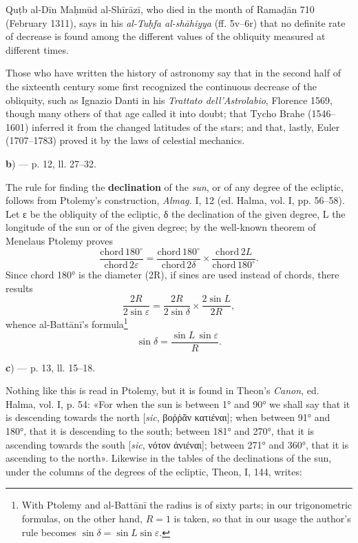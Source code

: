 \documentclass[11pt]{article}
\newcommand{\Pg}[1]{\marginpar{\footnotesize\color{gray}#1}}
\begin{document}
\par Quṭb al-Dīn Maḥmūd al-Shīrāzī, who died in the month of Ramaḍān 710 (February 1311), says in his \emph{al-Tuḥfa al-shāhiyya} (ff. 5v–6r) that no definite rate of decrease is found among the different values of the obliquity measured at different times.\par
\par Those who have written the history of astronomy say that in the second half of the sixteenth century some first recognized the continuous decrease of the obliquity, such as Ignazio Danti in his \emph{Trattato dell’Astrolabio}, Florence 1569, though many others of that age called it into doubt; that Tycho Brahe (1546–1601) inferred it from the changed latitudes of the stars; and that, lastly, Euler (1707–1783) proved it by the laws of celestial mechanics.\par
\par\begin{center}\textbf{b}) — p. 12, ll. 27–32.\end{center}
\par The rule for finding the \textbf{declination} of the \emph{sun}, or of any degree of the ecliptic, follows from Ptolemy's construction, \emph{Almag.} I, 12 (ed. Halma, vol. I, pp. 56–58). Let {\greekfont ε} be the obliquity of the ecliptic, {\greekfont δ} the declination of the given degree, L the longitude of the sun or of the given degree; by the well-known theorem of Menelaus Ptolemy proves \[ \frac{\text{chord}\,180^\circ}{\text{chord}\,2\varepsilon} = \frac{\text{chord}\,180^\circ}{\text{chord}\,2\delta} \times \frac{\text{chord}\,2L}{\text{chord}\,180^\circ}. \] Since chord 180° is the diameter (2R), if sines are used instead of chords, there results \[ \frac{2R}{2\sin\varepsilon} = \frac{2R}{2\sin\delta} \times \frac{2\sin L}{2R}, \] whence al-Battānī's formula\footnote{With Ptolemy and al-Battānī the radius is of sixty parts; in our trigonometric formulas, on the other hand, $R = 1$ is taken, so that in our usage the author's rule becomes $\sin\delta = \sin L \sin\varepsilon$.} \[ \sin\delta = \frac{\sin L\,\sin\varepsilon}{R}. \]\par
\par\begin{center}\textbf{c}) — p. 13, ll. 15–18.\end{center}
\par \Pg{I 163}Nothing like this is read in Ptolemy, but it is found in Theon's \emph{Canon}, ed. Halma, vol. I, p. 54: «For when the sun is between 1° and 90° we shall say that it is descending towards the north [\emph{sic}, {\greekfont βοῤῥᾶν κατιέναι}]; when between 91° and 180°, that it is descending to the south; between 181° and 270°, that it is ascending towards the south [\emph{sic}, {\greekfont νότον ἀνιέναι}]; between 271° and 360°, that it is ascending to the north». Likewise in the tables of the declinations of the sun, under the columns of the degrees of the ecliptic, Theon, I, 144, writes:\par
\end{document}
